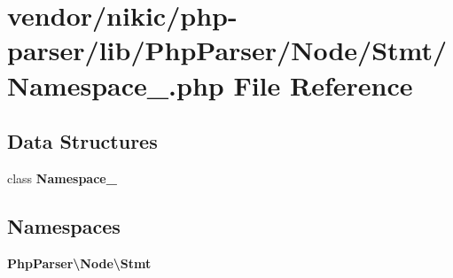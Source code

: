 \section{vendor/nikic/php-\/parser/lib/\+Php\+Parser/\+Node/\+Stmt/\+Namespace\+\_\+.php File Reference}
\label{_node_2_stmt_2_namespace___8php}
\subsection*{Data Structures}
\begin{DoxyCompactItemize}
\item 
class {\bf Namespace\+\_\+}
\end{DoxyCompactItemize}
\subsection*{Namespaces}
\begin{DoxyCompactItemize}
\item 
 {\bf Php\+Parser\textbackslash{}\+Node\textbackslash{}\+Stmt}
\end{DoxyCompactItemize}
